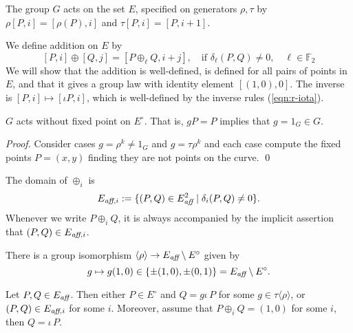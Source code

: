 \documentclass{llncs}
\newcommand{\ring}[1]{\mathbb{#1}}
\newcommand{\op}[1]{\hbox{#1}}
\newcommand{\Eaff}{E_{\op{\scriptsize\it aff}}}
\newcommand{\Eaf}[1]{E_{\op{\scriptsize\it aff},{#1}}}
\newcommand{\Eoo}{E^{\circ}} %
\newcommand{\ang}[1]{\langle{#1}\rangle}
\begin{document}
The group $G$ acts on the set $E$, specified on generators $\rho,\tau$
by $\rho[P,i]=[\rho(P),i]$ and $\tau[P,i]=[P,i+1]$.

We define addition on $E$ by
\begin{equation}\label{eqn:add-proj}
[P,i]\oplus [Q,j] = [P\oplus_\ell Q,i+j],\quad 
\text{if } \delta_\ell(P,Q)\ne 0,\quad \ell\in\ring{F}_2
\end{equation}
We will show that the addition is well-defined, is defined for all
pairs of points in $E$, and that it gives a group law with identity
element $[(1,0),0]$.  The inverse is $[P,i]\mapsto [\iota P,i]$, which
is well-defined by the inverse rules (\ref{eqn:r-iota}).


\begin{lemma} \label{lemma:no-fix} $G$ acts without fixed point on
  $\Eoo$.  That is, $g P = P$ implies that $g=1_G\in G$.
\end{lemma}

\begin{proof} Consider cases $g = \rho^k\ne 1_G$
and $g=\tau\rho^k$ and each case compute the fixed points $P=(x,y)$ finding they
are not points on the curve. 
\qed\end{proof}

The domain of $\oplus_i$ is
\[
\Eaf{i} := \{(P,Q)\in \Eaff^2\mid \delta_i(P,Q)\ne0\}.
\]
Whenever we write $P\oplus_i Q$, it is always accompanied by the
implicit assertion that $(P,Q)\in \Eaf{i}$.

There is a group isomorphism $\ang{\rho}\to \Eaff\setminus\Eoo$ given by
\[
g\mapsto g(1,0)\in\{\pm (1,0),\pm (0,1)\} = \Eaff\setminus \Eoo.
\]

\begin{lemma}[dichotomy]\label{lemma:noco} 
\par
\noindent  
Let $P,Q\in \Eaff$.  Then either $P\in \Eoo$ and $Q=g \iota\, P$ for
some $g\in \tau\ang{\rho}$, or $(P,Q)\in \Eaf{i}$ for some $i$.
Moreover, assume that $P\oplus_i Q = (1,0)$ for some $i$, then $Q =
\iota\,P$.
\end{lemma}
\end{document}
